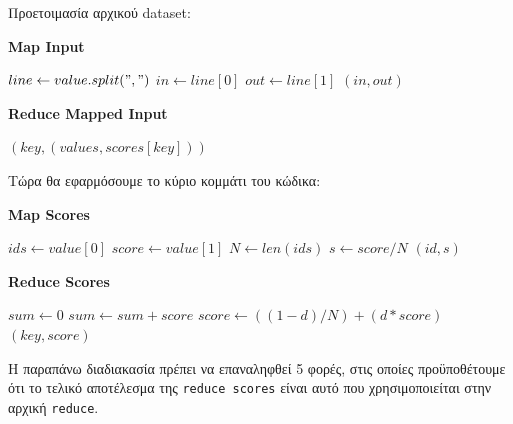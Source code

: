 \documentclass{ntua}
\begin{document}
Προετοιμασία αρχικού dataset:
\begin{algorithm}[H]
\caption*{\bfseries{Map Input}}
\begin{algorithmic}[1]
	\State $line \gets value.split(",")$
	\State $in \gets line[0]$
	\State $out \gets line[1]$
	\Emit $(in, out)$
	\EndFunction
\end{algorithmic}
\end{algorithm}

\begin{algorithm}[H]
\caption*{\bfseries{Reduce Mapped Input}}
\begin{algorithmic}[1]
	\Emit $(key, (values, scores[key]))$
	\EndFunction
\end{algorithmic}
\end{algorithm}

\noindent
Τώρα θα εφαρμόσουμε το κύριο κομμάτι του κώδικα:
\begin{algorithm}[H]
\caption*{\bfseries{Map Scores}}
\begin{algorithmic}[1]
	\State $ids \gets value[0]$
	\State $score \gets value[1]$
	\State $N \gets len(ids)$
		\State $s \gets score / N$
		\Emit $(id, s)$
	\EndFor
	\EndFunction
\end{algorithmic}
\end{algorithm}

\begin{algorithm}[H]
\caption*{\bfseries{Reduce Scores}}
\begin{algorithmic}[1]
	\State $sum \gets 0$
		\State $sum \gets sum + score$
	\EndFor
	\State $score \gets ((1 - d) / N) + (d * score)$
	\Emit $(key, score)$
	\EndFunction
\end{algorithmic}
\end{algorithm}

\noindent
Η παραπάνω διαδιακασία πρέπει να επαναληφθεί 5 φορές, στις οποίες προϋποθέτουμε ότι το τελικό αποτέλεσμα της \texttt{reduce scores} είναι αυτό που χρησιμοποιείται στην αρχική \texttt{reduce}.
\end{document}
